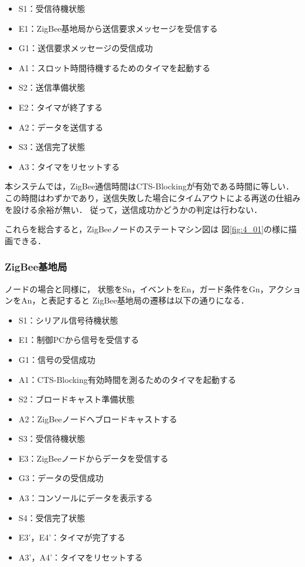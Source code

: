 \documentclass[12pt]{jreport}
\begin{document}
\begin{itemize}
 \item S1：受信待機状態
 \item E1：ZigBee基地局から送信要求メッセージを受信する
 \item G1：送信要求メッセージの受信成功
 \item A1：スロット時間待機するためのタイマを起動する
 \item S2：送信準備状態
 \item E2：タイマが終了する
 \item A2：データを送信する
 \item S3：送信完了状態
 \item A3：タイマをリセットする
\end{itemize}

本システムでは，ZigBee通信時間はCTS-Blockingが有効である時間に等しい．
この時間はわずかであり，送信失敗した場合にタイムアウトによる再送の仕組みを設ける余裕が無い．
従って，送信成功かどうかの判定は行わない．

これらを総合すると，ZigBeeノードのステートマシン図は
図\ref{fig:4_01}の様に描画できる．

\subsubsection{ZigBee基地局}

ノードの場合と同様に，
状態をSn，イベントをEn，ガード条件をGn，アクションをAn，と表記すると
ZigBee基地局の遷移は以下の通りになる．

\begin{itemize}
 \item S1：シリアル信号待機状態
 \item E1：制御PCから信号を受信する
 \item G1：信号の受信成功
 \item A1：CTS-Blocking有効時間を測るためのタイマを起動する
 \item S2：ブロードキャスト準備状態
 \item A2：ZigBeeノードへブロードキャストする
 \item S3：受信待機状態
 \item E3：ZigBeeノードからデータを受信する
 \item G3：データの受信成功
 \item A3：コンソールにデータを表示する
 \item S4：受信完了状態
 \item E3'，E4'：タイマが完了する
 \item A3'，A4'：タイマをリセットする
\end{itemize}
\end{document}
